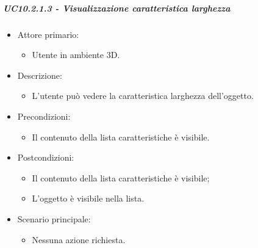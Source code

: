 \subparagraph{UC10.2.1.3 - Visualizzazione caratteristica larghezza}
\begin{itemize}

	\item Attore primario: 
	\begin{itemize}
		\item Utente in ambiente 3D.
	\end{itemize}
	\item Descrizione:
	\begin{itemize}
		\item L'utente può vedere la caratteristica larghezza dell'oggetto.
	\end{itemize}
	
	\item Precondizioni:
	\begin{itemize}
		\item Il contenuto della lista caratteristiche è visibile.
	\end{itemize}
	
	\item Postcondizioni:
	\begin{itemize}
		\item Il contenuto della lista caratteristiche è visibile;
		\item L'oggetto è visibile nella lista.
	\end{itemize}
	
	\item Scenario principale:
	\begin{itemize}
		\item Nessuna azione richiesta.
	\end{itemize}
	
\end{itemize}

